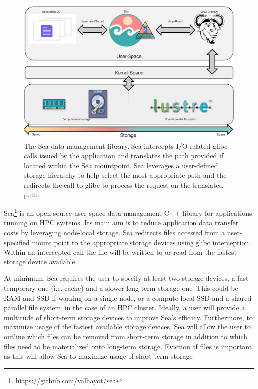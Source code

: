 \begin{figure}

    \centering
    \includegraphics[width=\columnwidth]{figures/sea-comp/seacomp-diagram.pdf}%
\caption{The Sea data-management library. Sea intercepts I/O-related glibc calls issued by the application and
translates the path provided if located within the Sea mountpoint. Sea leverages a user-defined storage hierarchy to help select the most appropriate path and the redirects the call to glibc to process the request on the translated path. }
\label{fig:seaneuro:diagram}
\end{figure}

Sea\footnote{\url{https://github.com/valhayot/sea}} is an open-source user-space
data-management C++ library for applications running on HPC systems. Its main
aim is to reduce application data transfer costs by leveraging node-local
storage. Sea redirects files accessed from a user-specified mount point to the
appropriate storage devices using glibc interception. Within an intercepted call
the file will be written to or read from the fastest storage device available. 


At minimum, Sea requires the user to specify at least two storage devices, a
fast temporary one (i.e. cache) and a slower long-term storage one. This could be RAM and SSD
if working on a single node, or a compute-local SSD and a shared parallel file
system, in the case of an HPC cluster. Ideally, a user will provide a multitude
of short-term storage devices to improve Sea's efficacy. Furthermore, to
maximize usage of the fastest available storage devices, Sea will allow the user
to outline which files can be removed from short-term storage in addition to
which files need to be materialized onto long-term storage. Eviction of files is
important as this will allow Sea to maximize usage of short-term storage.


